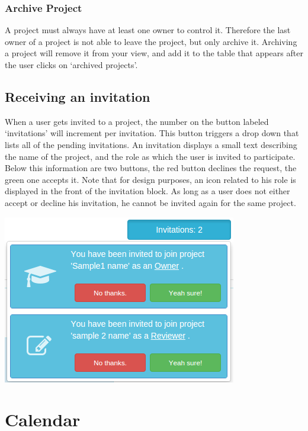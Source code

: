 \subsubsection{Archive Project}

A project must always have at least one owner to control it. Therefore the last owner of a project is not able to leave the project, but only
archive it. Archiving a project will remove it from your view, and add it to the table that appears after the user clicks on `archived projects'.

\subsection{Receiving an invitation}

When a user gets invited to a project, the number on the button labeled `invitations' will increment per invitation. This button triggers a drop down
that lists all of the pending invitations. An invitation displays a small text describing the name of the project, and the role as which the user is invited to participate. Below this information are two buttons, the red button declines the request, the green one accepts it.
Note that for design purposes, an icon related to his role is displayed in the front of the invitation block. 
As long as a user does not either accept or decline his invitation, he cannot be invited again for the same project.

\begin{center}
\includegraphics[scale=0.5]{./img/invitation.png}
\end{center}

\section{Calendar}

